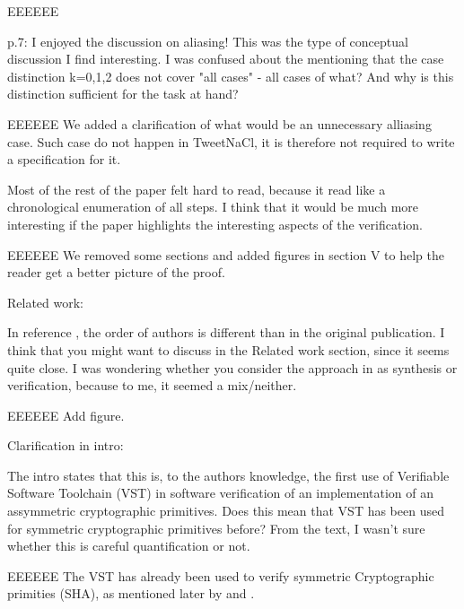\begin{answer}{EEEEEE}
\end{answer}

p.7: I enjoyed the discussion on aliasing! This was the type of conceptual
discussion I find interesting. I was confused about the mentioning that the case
distinction k=0,1,2 does not cover "all cases" - all cases of what? And why is
this distinction sufficient for the task at hand?

\begin{answer}{EEEEEE}
We added a clarification of what would be an unnecessary alliasing case.
Such case do not happen in TweetNaCl, it is therefore not required to write a
specification for it.
\end{answer}

Most of the rest of the paper felt hard to read, because it read like a
chronological enumeration of all steps. I think that it would be much more
interesting if the paper highlights the interesting aspects of the verification.

\begin{answer}{EEEEEE}
  We removed some sections and added figures in section V to help the reader get a
  better picture of the proof.
\end{answer}

Related work:

In reference \cite{DBLP:journals/corr/BhargavanDFHPRR17}, the order of authors
is different than in the original publication. I think that you might want to
discuss \cite{DBLP:journals/corr/BhargavanDFHPRR17} in the Related work
section, since it seems quite close. I was wondering whether you consider the
approach in \cite{DBLP:journals/corr/BhargavanDFHPRR17} as synthesis or
verification, because to me, it seemed a mix/neither.

\begin{answer}{EEEEEE}
Add figure.
\end{answer}

Clarification in intro:

The intro states that this is, to the authors knowledge, the first use of
Verifiable Software Toolchain (VST) in software verification of an implementation
of an assymmetric cryptographic primitives. Does this mean that VST has been
used for symmetric cryptographic primitives before? From the text, I wasn't sure
whether this is careful quantification or not.

\begin{answer}{EEEEEE}
The VST has already been used to verify symmetric Cryptographic
primities (\eg SHA), as mentioned later by \cite{Beringer2015VerifiedCA}
and \cite{2015-Appel}.
\end{answer}


